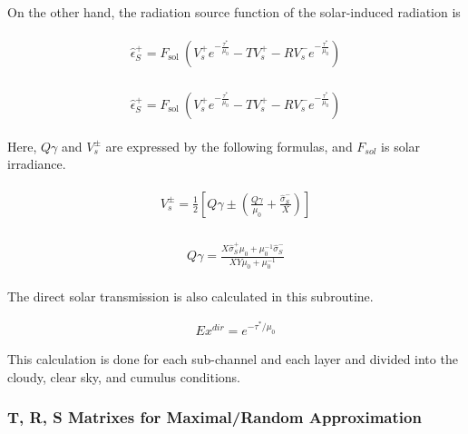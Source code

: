 On the other hand, the radiation source function of the solar-induced radiation is

\begin{eqnarray}
\begin{array}{l}
\hat{\epsilon}_{S}^{+}=F_{\text {sol }}\left(V_{s}^{+} e^{-\frac{\tau^{*}}{\mu_{0}}}-T V_{s}^{+}-R V_{s}^{-} e^{-\frac{\tau^{*}}{\mu_{0}}}\right)
\end{array}
\end{eqnarray}

\begin{eqnarray}
\begin{array}{l}
\hat{\epsilon}_{S}^{+}=F_{\text {sol }}\left(V_{s}^{+} e^{-\frac{\tau^{*}}{\mu_{0}}}-T V_{s}^{+}-R V_{s}^{-} e^{-\frac{\tau^{*}}{\mu_{0}}}\right)
\end{array}
\end{eqnarray}

Here, \(Q \gamma\) and \(V_{s}^{\pm}\) are expressed by the following formulas, and \(F_{sol}\) is solar irradiance.

\begin{eqnarray}
\begin{array}{c}
V_{s}^{\pm}=\frac{1}{2}\left[Q \gamma \pm\left(\frac{Q \gamma}{\mu_{0}}+\frac{\hat{\sigma}_{S}^{-}}{X}\right)\right]
\end{array}
\end{eqnarray}

\begin{eqnarray}
\begin{array}{c}
Q \gamma=\frac{X \hat{\sigma}_{S}^{+} \mu_{0}+\mu_{0}^{-1} \hat{\sigma}_{S}^{-}}{X Y \mu_{0}+\mu_{0}^{-1}}
\end{array}
\end{eqnarray}

The direct solar transmission is also calculated in this subroutine.

\begin{eqnarray}
E x^{d i r}=e^{-\tau^{*}/ \mu_{0}}
\end{eqnarray}

This calculation is done for each sub-channel and each layer and divided into the cloudy, clear sky, and cumulus conditions.

\hypertarget{t-r-s-matrixes-for-maximalrandom-approximation}{%
\subsubsection{T, R, S Matrixes for Maximal/Random Approximation}\label{t-r-s-matrixes-for-maximalrandom-approximation}}

